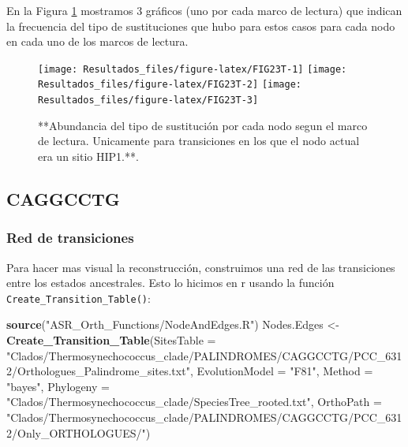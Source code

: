 \documentclass[
]{book}
\newenvironment{Shaded}{\begin{snugshade}}{\end{snugshade}}
\newcommand{\AttributeTok}[1]{\textcolor[rgb]{0.13,0.29,0.53}{#1}}
\newcommand{\FunctionTok}[1]{\textcolor[rgb]{0.13,0.29,0.53}{\textbf{#1}}}
\newcommand{\NormalTok}[1]{#1}
\newcommand{\OtherTok}[1]{\textcolor[rgb]{0.56,0.35,0.01}{#1}}
\newcommand{\StringTok}[1]{\textcolor[rgb]{0.31,0.60,0.02}{#1}}
\begin{document}
En la Figura \ref{fig:FIG23T} mostramos 3 gráficos (uno por cada marco de lectura) que indican la frecuencia del tipo de sustituciones que hubo para estos casos para cada nodo en cada uno de los marcos de lectura.

\begin{figure}

{\centering \texttt{[image: Resultados\_files/figure-latex/FIG23T-1]} \texttt{[image: Resultados\_files/figure-latex/FIG23T-2]} \texttt{[image: Resultados\_files/figure-latex/FIG23T-3]} 

}

\caption{**Abundancia del tipo de sustitución por cada nodo segun el marco de lectura. Unicamente para transiciones en los que el nodo actual era un sitio HIP1.**.}\label{fig:FIG23T}
\end{figure}

\hypertarget{caggcctg}{%
\subsection{CAGGCCTG}\label{caggcctg}}

\hypertarget{red-de-transiciones-8}{%
\subsubsection{Red de transiciones}\label{red-de-transiciones-8}}

Para hacer mas visual la reconstrucción, construimos una red de las transiciones entre los estados ancestrales. Esto lo hicimos en r usando la función \texttt{Create\_Transition\_Table()}:

\begin{Shaded}
\begin{Highlighting}[]
\FunctionTok{source}\NormalTok{(}\StringTok{"ASR\_Orth\_Functions/NodeAndEdges.R"}\NormalTok{)}
\NormalTok{Nodes.Edges }\OtherTok{\textless{}{-}} \FunctionTok{Create\_Transition\_Table}\NormalTok{(}\AttributeTok{SitesTable =} \StringTok{"Clados/Thermosynechococcus\_clade/PALINDROMES/CAGGCCTG/PCC\_6312/Orthologues\_Palindrome\_sites.txt"}\NormalTok{,}
                                \AttributeTok{EvolutionModel =} \StringTok{"F81"}\NormalTok{,}
                                \AttributeTok{Method =} \StringTok{"bayes"}\NormalTok{,}
                                \AttributeTok{Phylogeny =} \StringTok{"Clados/Thermosynechococcus\_clade/SpeciesTree\_rooted.txt"}\NormalTok{,}
                                \AttributeTok{OrthoPath =} \StringTok{"Clados/Thermosynechococcus\_clade/PALINDROMES/CAGGCCTG/PCC\_6312/Only\_ORTHOLOGUES/"}\NormalTok{)}
\end{Highlighting}
\end{Shaded}
\end{document}

